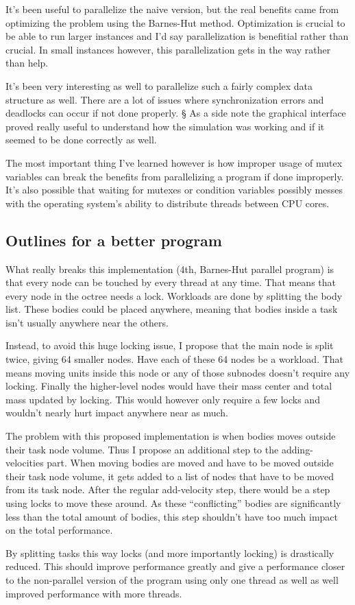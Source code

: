 \documentclass[a4paper] {article}
\begin{document}
It's been useful to parallelize the naive version, but the real benefits came from optimizing the problem using the Barnes-Hut method. Optimization is crucial to be able to run larger instances and I'd say parallelization is benefitial rather than crucial. In small instances however, this parallelization gets in the way rather than help.

It's been very interesting as well to parallelize such a fairly complex data structure as well. There are a lot of issues where synchronization errors and deadlocks can occur if not done properly.
§
As a side note the graphical interface proved really useful to understand how the simulation was working and if it seemed to be done correctly as well.

The most important thing I've learned however is how improper usage of mutex variables can break the benefits from parallelizing a program if done improperly. It's also possible that waiting for mutexes or condition variables possibly messes with the operating system's ability to distribute threads between CPU cores.

\subsection{Outlines for a better program}

What really breaks this implementation (4th, Barnes-Hut parallel program) is that every node can be touched by every thread at any time. That means that every node in the octree needs a lock. Workloads are done by splitting the body list. These bodies could be placed anywhere, meaning that bodies inside a task isn't usually anywhere near the others.

Instead, to avoid this huge locking issue, I propose that the main node is split twice, giving 64 smaller nodes. Have each of these 64 nodes be a workload. That means moving units inside this node or any of those subnodes doesn't require any locking. Finally the higher-level nodes would have their mass center and total mass updated by locking. This would however only require a few locks and wouldn't nearly hurt impact anywhere near as much.

The problem with this proposed implementation is when bodies moves outside their task node volume. Thus I propose an additional step to the adding-velocities part. When moving bodies are moved and have to be moved outside their task node volume, it gets added to a list of nodes that have to be moved from its task node. After the regular add-velocity step, there would be a step using locks to move these around. As these ``conflicting'' bodies are significantly less than the total amount of bodies, this step shouldn't have too much impact on the total performance.

By splitting tasks this way locks (and more importantly locking) is drastically reduced. This should improve performance greatly and give a performance closer to the non-parallel version of the program using only one thread as well as well improved performance with more threads.
\end{document}
